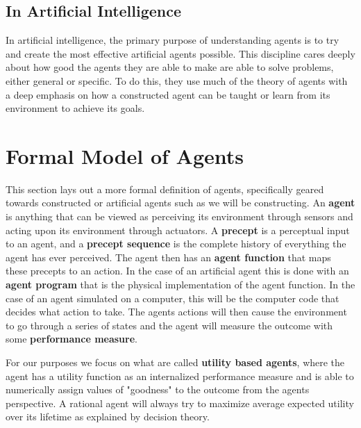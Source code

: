 \documentclass[12pt,twoside]{reedthesis}
\begin{document}
\subsection{In Artificial Intelligence}\label{commands}
In artificial intelligence, the primary purpose of understanding agents is to try and create the most effective artificial agents possible. This discipline cares deeply about how good the agents they are able to make are able to solve problems, either general or specific. To do this, they use much of the theory of agents with a deep emphasis on how a constructed agent can be taught or learn from its environment to achieve its goals.


	
\section{Formal Model of Agents}
This section lays out a more formal definition of agents, specifically geared towards constructed or artificial agents such as we will be constructing. An \textbf{agent} is anything that can be viewed as perceiving its environment through sensors and acting upon its environment through actuators. A \textbf{precept} is a perceptual input to an agent, and a \textbf{precept sequence} is the complete history of everything the agent has ever perceived. The agent then has an \textbf{agent function} that maps these precepts to an action. In the case of an artificial agent this is done with an \textbf{agent program} that is the physical implementation of the agent function. In the case of an agent simulated on a computer, this will be the computer code that decides what action to take. The agents actions will then cause the environment to go through a series of states and the agent will measure the outcome with some \textbf{performance measure}.

%	

For our purposes we focus on what are called \textbf{utility based agents}, where the agent has a utility function as an internalized performance measure and is able to numerically assign values of "goodness" to the outcome from the agents perspective. A rational agent will always try to maximize average expected utility over its lifetime as explained by decision theory.
\end{document}
